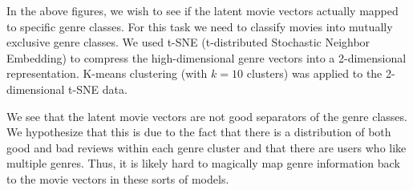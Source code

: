 In the above figures, we wish to see if the latent movie vectors actually mapped to specific genre classes. For this task we need to classify movies into mutually exclusive genre classes. We used t-SNE (t-distributed Stochastic Neighbor Embedding) to compress the high-dimensional genre vectors into a 2-dimensional representation. K-means clustering (with $k=10$ clusters) was applied to the 2-dimensional t-SNE data. \newline

We see that the latent movie vectors are not good separators of the genre classes. We hypothesize that this is due to the fact that there is a distribution of both good and bad reviews within each genre cluster and that there are users who like multiple genres. Thus, it is likely hard to magically map genre information back to the movie vectors in these sorts of models.



